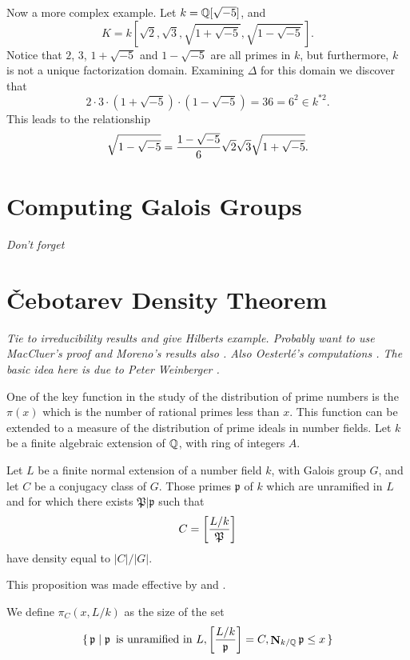 \medskip
Now a more complex example.  Let $k = \mathbb{Q}[\sqrt{-5}]$, and 
\[
K = k[\sqrt{2}, \sqrt{3}, \sqrt{1+\sqrt{-5}}, \sqrt{1-\sqrt{-5}}].
\]
Notice that $2$, $3$, $1+\sqrt{-5}$ and $1-\sqrt{-5}$ are all primes in
$k$, but furthermore, $k$ is not a unique factorization domain.
Examining $\Delta$ for this domain we discover that
\[
2\cdot 3\cdot(1+\sqrt{-5})\cdot(1-\sqrt{-5})= 36 
  = 6^2 \in k^{\ast2}.
\]
This leads to the relationship
\[
\sqrt{1-\sqrt{-5}} 
  = {1 - \sqrt{-5} \over 6} \sqrt{2} \sqrt{3} \sqrt{1+\sqrt{-5}}.
\]

\section{Computing Galois Groups}

{\em Don't forget \cite{Mckay79}}

\section{\v{C}ebotarev Density Theorem}
\label{Cebotarev:Sec}

{\em Tie to irreducibility results and give Hilberts example.
Probably want to use MacCluer's proof \cite{MacCluer68} and Moreno's
results also \cite{Moreno:Chebotarev}.  Also Oesterl\'e's computations
\cite{Oesterle79}.  The basic idea here is due to Peter Weinberger
\cite{Weinberger84}.} 


One of the key function in the study of the distribution of prime
numbers is the $\pi(x)$ which is the number of rational primes less
than $x$.  This function can be extended to a measure of the
distribution of prime ideals in number fields.  Let $k$ be a finite
algebraic extension of $\mathbb{Q}$, with ring of integers $A$.

\begin{proposition}[\Chebotarev] 
\label{Cebotarev:Density:Prop}
Let $L$ be a finite normal extension of a number field $k$, with Galois
group $G$, and let $C$ be a conjugacy class of $G$.  Those primes $\mathfrak{p}$ of $k$ which are unramified in $L$ and for which there exists $\mathfrak{P} |\mathfrak{p}$ such that
\[
C = \left[\frac{L/k}{\frak P}\right]
\]
have density equal to $|C|/|G|$.
\end{proposition}

This proposition was made effective by {\Lagarias} and {\Odlyzko}
\cite{Lagarias77}.

We define $\pi_{C}(x, L/k)$ as the size of the set
\[
\{\, {\frak p} \mid {\frak p} \enspace\mbox{is unramified in $L$},
\left[\frac{L/k}{\frak p}\right] = C, \mathop{\mathbf{N}}\nolimits_{k/\mathbb{Q}}{\frak p} \le x\,\}
\]


